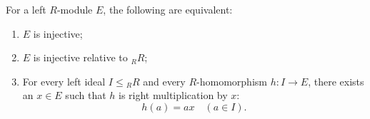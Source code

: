 For a left $R$-module $E$, the following are equivalent:
\begin{enumerate}
\item[(a)] $E$ is injective;
\item[(b)] $E$ is injective relative to ${}_R R$;
\item[(c)] For every left ideal $I \leq {}_R R$ and every $R$-homomorphism $h: I \to E$, there exists an $x \in E$ such that $h$ is right multiplication by $x$:
$$h(a) = ax \quad (a \in I).$$
\end{enumerate}
